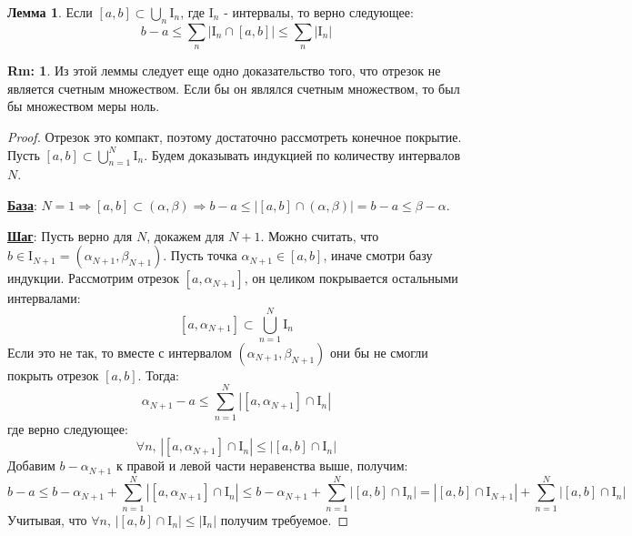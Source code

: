 \documentclass[12pt]{article}
\newcommand{\MI}{\mathrm{I}}
\theoremstyle{definition}
\newtheorem{rem}{Rm:}
\newtheorem{lemma}{Лемма}
\begin{document}
\begin{lemma}
	Если $[a,b] \subset \displaystyle \bigcup\limits_n \MI_n$, где $\MI_n$ - интервалы, то верно следующее: 
	$$
		b - a \leq \displaystyle \sum\limits_n |\MI_n \cap [a,b]| \leq \displaystyle \sum\limits_n |\MI_n|
	$$	
\end{lemma}
\begin{rem}
	Из этой леммы следует еще одно доказательство того, что отрезок не является счетным множеством. Если бы он являлся счетным множеством, то был бы множеством меры ноль.
\end{rem}
\begin{proof}
	Отрезок это компакт, поэтому достаточно рассмотреть конечное покрытие. Пусть $[a,b] \subset \displaystyle \bigcup\limits_{n=1}^N \MI_n$. Будем доказывать индукцией по количеству интервалов	$N$.
	
	\textbf{\uline{База}}: $N = 1 \Rightarrow [a,b] \subset (\alpha,\beta) \Rightarrow b - a \leq |[a,b] \cap (\alpha,\beta)| = b-a  \leq \beta - \alpha$.
	
	\textbf{\uline{Шаг}}: Пусть верно для $N$, докажем для $N+1$. Можно считать, что $b \in \MI_{N+1} = (\alpha_{N+1}, \beta_{N+1})$. Пусть точка $\alpha_{N+1} \in [a,b]$, иначе смотри базу индукции. Рассмотрим отрезок $[a,\alpha_{N+1}]$, он целиком покрывается остальными интервалами:
	$$
		[a,\alpha_{N+1}] \subset \displaystyle \bigcup\limits_{n = 1}^{N} \MI_n
	$$
	Если это не так, то вместе с интервалом $(\alpha_{N+1}, \beta_{N+1})$ они бы не смогли покрыть отрезок $[a,b]$. Тогда:
	$$
		\alpha_{N+1} - a \leq \sum\limits_{n = 1}^{N} |[a,\alpha_{N+1}] \cap \MI_n|
	$$
	где верно следующее:
	$$
		\forall n, \, |[a,\alpha_{N+1}] \cap \MI_n| \leq |[a,b] \cap \MI_n|
	$$ 
	Добавим $b - \alpha_{N+1}$ к правой и левой части неравенства выше, получим:
	$$
		b - a \leq b - \alpha_{N+1} + \sum\limits_{n = 1}^{N} |[a,\alpha_{N+1}] \cap \MI_n| \leq b - \alpha_{N+1} + \sum\limits_{n = 1}^{N} |[a,b] \cap \MI_n| = |[a,b]\cap \MI_{N+1}| +  \sum\limits_{n = 1}^{N} |[a,b] \cap \MI_n|
	$$
	Учитывая, что $\forall n, \, |[a,b]\cap \MI_n| \leq |\MI_n|$ получим требуемое.
\end{proof}
\end{document}
